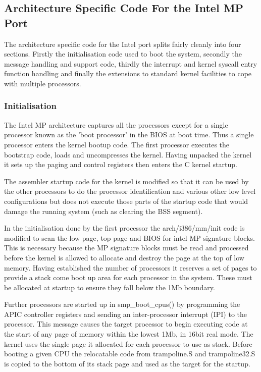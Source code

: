 \documentclass[]{article}
\begin{document}
\subsection{Architecture Specific Code For the Intel MP Port}
The architecture specific code for the Intel port splits fairly cleanly 
into four sections. Firstly the initialisation code used to boot the 
system, secondly the message handling and support code, thirdly the 
interrupt and kernel syscall entry function handling and finally the 
extensions to standard kernel facilities to cope with multiple processors.

\subsubsection{Initialisation}	
The Intel MP architecture captures all the processors except for a single 
processor known as the 'boot processor' in the BIOS at boot time. Thus a 
single processor enters the kernel bootup code. The first processor 
executes the bootstrap code, loads and uncompresses the kernel. Having 
unpacked the kernel it sets up the paging and control registers then enters 
the C kernel startup.

The assembler startup code for the kernel is modified so that it can be 
used by the other processors to do the processor identification and various 
other low level configurations but does not execute those parts of the 
startup code that would damage the running system (such as clearing the BSS 
segment). 

In the initialisation done by the first processor the arch/i386/mm/init 
code is modified to scan the low page, top page and BIOS for intel MP 
signature blocks. This is necessary because the MP signature blocks must 
be read and processed before the kernel is allowed to allocate and destroy 
the page at the top of low memory. Having established the number of 
processors it reserves a set of pages to provide a stack come boot up area 
for each processor in the system. These must be allocated at startup to 
ensure they fall below the 1Mb boundary.

Further processors are started up in smp\_boot\_cpus() by programming the 
APIC controller registers and sending an inter-processor interrupt (IPI) to 
the processor. This message causes the target processor to begin executing 
code at the start of any page of memory within the lowest 1Mb, in 16bit 
real mode. The kernel uses the single page it allocated for each processor 
to use as stack. Before booting a given CPU the relocatable code from 
trampoline.S and trampoline32.S is copied to the bottom of its stack page 
and used as the target for the startup. 
\end{document}
